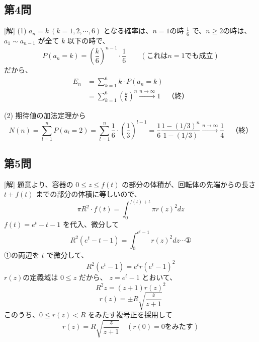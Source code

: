 \documentclass[../main.tex]{subfiles}
\begin{document}
\begin{center}
\end{center}

\subsection*{第4問}
[解] (1) $a_n = k \ (k=1,2,\cdots,6)$ となる確率は、$n=1$の時 $\frac{1}{6}$ で、$n \ge 2$の時は、$a_1 \sim a_{n-1}$ が全て $k$ 以下の時で、
\[ P(a_n = k) = \left(\frac{k}{6}\right)^{n-1} \cdot \frac{1}{6} \qquad (\text{これは} n=1 \text{でも成立}) \]
だから、
\begin{align*}
  E_n &= \sum_{k=1}^6 k \cdot P(a_n = k) \\
  &= \sum_{k=1}^6 \left(\frac{k}{6}\right)^n \xrightarrow{n \to \infty} 1 \quad \text{（終）}
\end{align*}

(2) 期待値の加法定理から
\[ N(n) = \sum_{l=1}^n P(a_l = 2) = \sum_{l=1}^n \frac{1}{6} \cdot \left(\frac{1}{3}\right)^{l-1} = \frac{1}{6} \frac{1 - (1/3)^n}{1 - (1/3)} \xrightarrow{n \to \infty} \frac{1}{4} \quad \text{（終）} \]

\subsection*{第5問}
[解] 題意より、容器の $0 \le z \le f(t)$ の部分の体積が、回転体の先端からの長さ $t + f(t)$ までの部分の体積に等しいので、
\[ \pi R^2 \cdot f(t) = \int_0^{f(t)+t} \pi r(z)^2 dz \]
$f(t) = e^t - t - 1$ を代入、微分して
\[ R^2(e^t - t - 1) = \int_0^{e^t - 1} r(z)^2 dz \cdots \text{①} \]
①の両辺を $t$ で微分して、
\[ R^2(e^t - 1) = e^t r(e^t - 1)^2 \]
$r(z)$の定義域は $0 \le z$ だから、
$z = e^t - 1$ とおいて、
\[ R^2 z = (z+1) r(z)^2 \]
\[ r(z) = \pm R \sqrt{\frac{z}{z+1}} \]
このうち、$0 \le r(z) < R$ をみたす複号正を採用して
\[ r(z) = R \sqrt{\frac{z}{z+1}} \quad (r(0)=0 \text{をみたす}) \]
\end{document}
